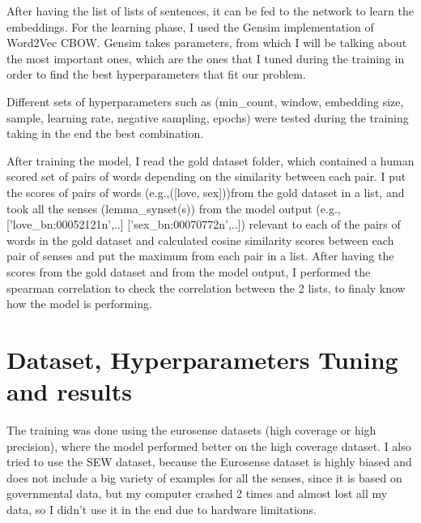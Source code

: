 \documentclass[paper=a4, fontsize=10pt, oneside]{scrartcl}
\begin{document}
\begin{adjustwidth}{-60pt}{-60pt}
After having the list of lists of sentences, it can be fed to the network to learn the embeddings. For the learning phase, I used the Gensim implementation of Word2Vec CBOW. Gensim takes parameters, from which I will be talking about the most important ones, which are the ones that I tuned during the training in order to find the best hyperparameters that fit our problem.

Different sets of hyperparameters such as (min\_count, window, embedding size, sample, learning rate, negative sampling, epochs) were tested during the training taking in the end the best combination.

After training the model, I read the gold dataset folder, which contained a human scored set of pairs of words depending on the similarity between each pair. I put the scores of pairs of words (e.g.,([love, sex]))from the gold dataset in a list, and took all the senses (lemma\_synset(s)) from the model output (e.g.,['love\_bn:00052121n',..] ['sex\_bn:00070772n',..]) relevant to each of the pairs of words in the gold dataset and calculated cosine similarity scores between each pair of senses and put the maximum from each pair in a list. After having the scores from the gold dataset and from the model output, I performed the spearman correlation to check the correlation between the 2 lists, to finaly know how the model is performing.

\section{Dataset, Hyperparameters Tuning and results}

The training was done using the eurosense datasets (high coverage or high precision), where the model performed better on the high coverage dataset. I also tried to use the SEW dataset, because the Eurosense dataset is highly biased and does not include a big variety of examples for all the senses, since it is based on governmental data, but my computer crashed 2 times and almost lost all my data, so I didn't use it in the end due to hardware limitations.


\end{adjustwidth}
\end{document}
